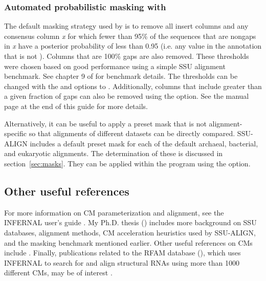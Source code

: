\subsubsection{Automated probabilistic masking with }

The default masking strategy used by  is to remove all
insert columns and any consensus column \emph{x} for which fewer than 95\% of
the sequences that are nongaps in \emph{x} have a posterior
probability of less than 0.95 (i.e. any value in the 
annotation that is not \prog{*}). Columns that are 100\% gaps are also
removed. These thresholds were chosen based on good performance using
a simple SSU alignment benchmark. See chapter 9 of \cite{Nawrocki09} for
benchmark details. The thresholds can be changed with the  and
 options to . Additionally, columns that include
greater than a given fraction of gaps can also be removed using the
 option. See the  manual page at the
end of this guide for more details.

Alternatively, it can be useful to apply a preset mask that is not
alignment-specific so that alignments of different datasets can be
directly compared. SSU-ALIGN includes a default preset mask for
each of the default archaeal, bacterial, and eukaryotic
alignments. The determination of these is discussed in
section~\ref{sec:masks}. They can be applied within the
 program using the  option.

\subsection{Other useful references}

For more information on CM parameterization and alignment, see the
INFERNAL user's guide \cite{infernalguide}.  My
Ph.D. thesis ()
includes more background on SSU databases, alignment methods, CM
acceleration heuristics used by SSU-ALIGN, and the masking
benchmark mentioned earlier. Other useful references on CMs include
\cite{Eddy94,Eddy02b,NawrockiEddy07,Nawrocki09,KolbeEddy09}. Finally,
publications related to the RFAM database
(),
which uses INFERNAL to search for and align structural RNAs
using more than 1000 different CMs, may be of interest
\cite{Griffiths-Jones03,Griffiths-Jones05,Gardner09}.


